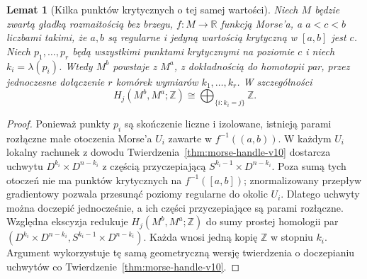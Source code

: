 \documentclass[11pt,a4paper,oneside]{report}
\newcommand{\R}{\mathbb{R}}
\newcommand{\Z}{\mathbb{Z}}
\theoremstyle{plain}
\newtheorem{lemat}[twierdzenie]{Lemat}
\theoremstyle{definition}
\theoremstyle{remark}
\begin{document}
\begin{lemat}[Kilka punktów krytycznych o tej samej wartości]
\label{lem:morse-same-level-audit}
Niech $M$ będzie zwartą gładką rozmaitością bez brzegu,
$f:M\to\R$ funkcją Morse'a, a $a<c<b$ liczbami takimi, że
$a,b$ są regularne i jedyną wartością krytyczną w $[a,b]$ jest $c$.
Niech $p_1,\dots,p_r$ będą wszystkimi punktami krytycznymi na
poziomie $c$ i niech $k_i=\lambda(p_i)$. Wtedy $M^b$ powstaje z $M^a$,
z dokładnością do homotopii par, przez jednoczesne dołączenie
$r$ komórek wymiarów $k_1,\dots,k_r$. W szczególności
\[
 H_j(M^b,M^a;\Z)\cong
 \bigoplus_{\{i:k_i=j\}}\Z.
\]
\end{lemat}
\begin{proof}
Ponieważ punkty $p_i$ są skończenie liczne i izolowane, istnieją
parami rozłączne małe otoczenia Morse'a $U_i$ zawarte w
$f^{-1}((a,b))$. W każdym $U_i$ lokalny rachunek z dowodu
Twierdzenia~\ref{thm:morse-handle-v10} dostarcza uchwytu
$D^{k_i}\times D^{n-k_i}$ z częścią przyczepiającą
$S^{k_i-1}\times D^{n-k_i}$. Poza sumą tych otoczeń
nie ma punktów krytycznych na $f^{-1}([a,b])$;
znormalizowany przepływ gradientowy pozwala przesunąć
poziomy regularne do okolic $U_i$. Dlatego uchwyty można
doczepić jednocześnie, a ich części przyczepiające są
parami rozłączne. Względna ekscyzja redukuje
$H_j(M^b,M^a;\Z)$ do sumy prostej homologii par
$(D^{k_i}\times D^{n-k_i},S^{k_i-1}\times D^{n-k_i})$.
Każda wnosi jedną kopię $\Z$ w stopniu $k_i$.
Argument wykorzystuje tę samą geometryczną wersję twierdzenia
o doczepianiu uchwytów co Twierdzenie~\ref{thm:morse-handle-v10}.
\end{proof}
\end{document}
